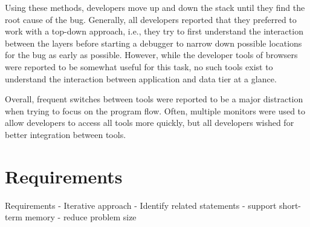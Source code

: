 Using these methods, developers move up and down the stack until they find the root cause of the bug.
Generally, all developers reported that they preferred to work with a top-down approach, i.e., they try to first understand the interaction between the layers before starting a debugger to narrow down possible locations for the bug as early as possible.
However, while the developer tools of browsers were reported to be somewhat useful for this task, no such tools exist to understand the interaction between application and data tier at a glance.

Overall, frequent switches between tools were reported to be a major distraction when trying to focus on the program flow.
Often, multiple monitors were used to allow developers to access all tools more quickly, but all developers wished for better integration between tools.
\tmpEnd

\section{Requirements}

Requirements
- Iterative approach
- Identify related statements
- support short-term memory
- reduce problem size

